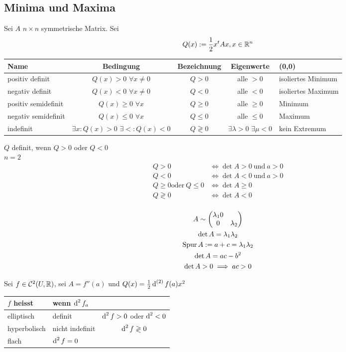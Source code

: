 \subsection{Minima und Maxima}
\begin{Bem}
  Sei $A$ $n\times n$ symmetrische Matrix. Sei 
  \begin{align*}
    Q(x):=\frac{1}{2} x^tAx,x\in\mathbb{R}^n
  \end{align*}
  \begin{table}[htb]
    \centering
    \begin{tabular}{l|c|c|c|l}
      Name&Bedingung&Bezeichnung&Eigenwerte&(0,0)\\
      \hline
      positiv definit&$Q(x)>0$ $\forall x\neq 0$&$Q>0$& alle $>0$&isoliertes Minimum\\
      negativ definit&$Q(x)<0$ $\forall x\neq 0$&$Q<0$& alle $<0$&isoliertes Maximum\\
      positiv semidefinit&$Q(x)\geq0$ $\forall x$&$Q\geq0$& alle $\geq0$&Minimum\\
      negativ semidefinit&$Q(x)\leq0$ $\forall x$&$Q\leq0$& alle $\leq0$&Maximum\\
      indefinit&$\exists x:Q(x)>0$ $\exists <:Q(x)<0$& $Q\gtrless 0$&$\exists \lambda>0$ $\exists \mu<0$&kein Extremum
    \end{tabular}
  \end{table}
  $Q$ definit, wenn $Q>0$ oder $Q<0$\\
  $n=2$
  \begin{align*}
    Q>0 &\iff \det A>0\ \text{und}\ a>0\\
    Q<0 &\iff \det A<0\ \text{und}\ a>0\\
    Q\geq0 \text{oder}\ Q\leq 0&\iff \det A\geq0\\
    Q\gtrless 0&\iff \det A<0\\
  \end{align*}
\end{Bem}
\begin{Bew}
  \begin{gather*}
    A\sim\begin{pmatrix}\lambda_1 0&\\0&\lambda_2\end{pmatrix}\\
    \det A=\lambda_1\lambda_2\\
    \operatorname{Spur} A:= a+c = \lambda_1\lambda_2\\
    \det A=ac-b^2\\
    \det A >0\implies ac > 0
  \end{gather*}
\end{Bew}
\begin{Def}
  Sei $f\in\mathcal{C}^2(U,\mathbb{R})$, sei $A=f''(a)$ und $Q(x)=\frac{1}{2}\operatorname{d}^{(2)}f(a)x^2$
  \begin{table}[htb]
    \centering
    \begin{tabular}{l|l|c}
      $f$ heisst& wenn $\operatorname{d}^2 f_a$\\
      \hline
      elliptisch&definit&$\operatorname{d}^2f>0$ oder $\operatorname{d}^2<0$\\
      hyperbolisch&nicht indefinit&$\operatorname{d}^2f\gtrless 0$\\
      flach&$\operatorname{d}^2f=0$
    \end{tabular}
  \end{table}
\end{Def}
